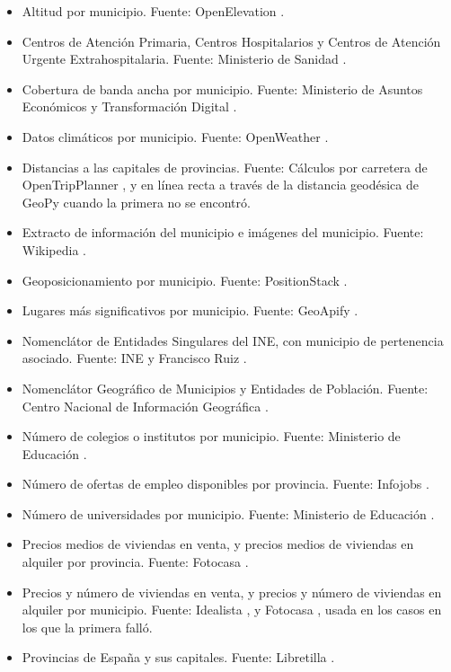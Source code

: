 \begin{itemize}
    \item Altitud por municipio. Fuente: OpenElevation \cite{openelevation}.
    \item Centros de Atención Primaria, Centros Hospitalarios y Centros de Atención Urgente Extrahospitalaria. Fuente: Ministerio de Sanidad \cite{salud}.
    \item Cobertura de banda ancha por municipio. Fuente: Ministerio de Asuntos Económicos y Transformación Digital \cite{cobertura}.
    \item Datos climáticos por municipio. Fuente: OpenWeather \cite{openweather}.
    \item Distancias a las capitales de provincias. Fuente: Cálculos por carretera de OpenTripPlanner \cite{otp}, y en línea recta a través de la distancia geodésica de GeoPy \cite{GeoPy} cuando la primera no se encontró.
    \item Extracto de información del municipio e imágenes del municipio. Fuente: Wikipedia \cite{wikipedia_api}.
    \item Geoposicionamiento por municipio. Fuente: PositionStack \cite{positionstack}.
    \item Lugares más significativos por municipio. Fuente: GeoApify \cite{geoapify}.
    \item Nomenclátor de Entidades Singulares del INE, con municipio de pertenencia asociado. Fuente: INE \cite{municipios_ine} y Francisco Ruiz \cite{entidades}.
    \item Nomenclátor Geográfico de Municipios y Entidades de Población. Fuente: Centro Nacional de Información Geográfica \cite{nomenclator}.
    \item Número de colegios o institutos por municipio. Fuente: Ministerio de Educación \cite{colegios}.
    \item Número de ofertas de empleo disponibles por provincia. Fuente: Infojobs \cite{infojobs}.
    \item Número de universidades por municipio. Fuente: Ministerio de Educación \cite{universidades}.
    \item Precios medios de viviendas en venta, y precios medios de viviendas en alquiler por provincia. Fuente: Fotocasa \cite{fotocasa}.
    \item Precios y número de viviendas en venta, y precios y número de viviendas en alquiler por municipio. Fuente: Idealista \cite{idealista}, y Fotocasa \cite{fotocasa}, usada en los casos en los que la primera falló.
    \item Provincias de España y sus capitales. Fuente: Libretilla \cite{provincias}.

\end{itemize}
